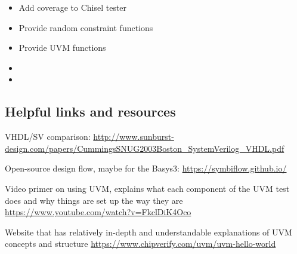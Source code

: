 \documentclass[conference]{IEEEtran}
\begin{document}
\begin{itemize}
\item Add coverage to Chisel tester
\item Provide random constraint functions
\item Provide UVM functions
\item 
\item 
\end{itemize}

\subsection{Helpful links and resources}

VHDL/SV comparison: \url{http://www.sunburst-design.com/papers/CummingsSNUG2003Boston_SystemVerilog_VHDL.pdf}

Open-source design flow, maybe for the Basys3: \url{https://symbiflow.github.io/}

Video primer on using UVM, explains what each component of the UVM test does and why things are set up the way they are
\url{https://www.youtube.com/watch?v=FkclDiK4Oco}

Website that has relatively in-depth and understandable explanations of UVM concepts and structure
\url{https://www.chipverify.com/uvm/uvm-hello-world}
\end{document}
